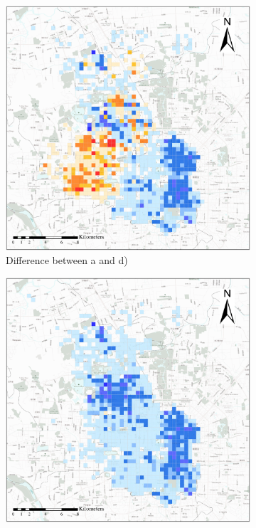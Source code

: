 \documentclass[preprints,article,accept,moreauthors,pdftex]{Definitions/mdpi}
\begin{document}
\begin{figure}[ht]
    \vspace{6pt}
    \begin{subfigure}{.28\textwidth}
        \includegraphics[width=\textwidth]{Figures/BSSMinusmp1.eps}
        \caption{Difference between a and d)}\label{fig:p_a_dif}
    \end{subfigure}
        \begin{subfigure}{.28\textwidth}
        \includegraphics[width=\textwidth]{Figures/BSSMinusmp2.eps}

\end{subfigure}
\end{figure}
\end{document}

